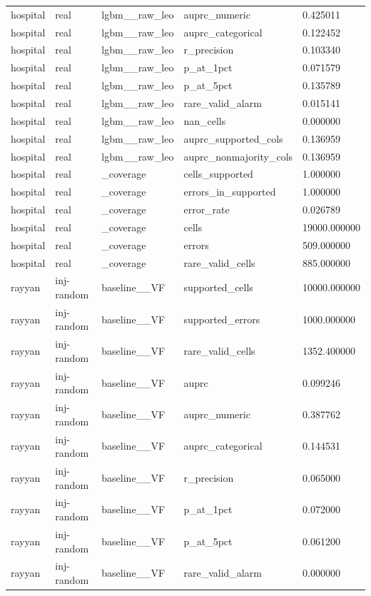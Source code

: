 \begin{tabular}{lllll}
hospital & real & lgbm\_\_raw\_leo & auprc\_numeric & 0.425011 \\
hospital & real & lgbm\_\_raw\_leo & auprc\_categorical & 0.122452 \\
hospital & real & lgbm\_\_raw\_leo & r\_precision & 0.103340 \\
hospital & real & lgbm\_\_raw\_leo & p\_at\_1pct & 0.071579 \\
hospital & real & lgbm\_\_raw\_leo & p\_at\_5pct & 0.135789 \\
hospital & real & lgbm\_\_raw\_leo & rare\_valid\_alarm & 0.015141 \\
hospital & real & lgbm\_\_raw\_leo & nan\_cells & 0.000000 \\
hospital & real & lgbm\_\_raw\_leo & auprc\_supported\_cols & 0.136959 \\
hospital & real & lgbm\_\_raw\_leo & auprc\_nonmajority\_cols & 0.136959 \\
hospital & real & \_coverage & cells\_supported & 1.000000 \\
hospital & real & \_coverage & errors\_in\_supported & 1.000000 \\
hospital & real & \_coverage & error\_rate & 0.026789 \\
hospital & real & \_coverage & cells & 19000.000000 \\
hospital & real & \_coverage & errors & 509.000000 \\
hospital & real & \_coverage & rare\_valid\_cells & 885.000000 \\
rayyan & inj-random & baseline\_\_VF & supported\_cells & 10000.000000 \\
rayyan & inj-random & baseline\_\_VF & supported\_errors & 1000.000000 \\
rayyan & inj-random & baseline\_\_VF & rare\_valid\_cells & 1352.400000 \\
rayyan & inj-random & baseline\_\_VF & auprc & 0.099246 \\
rayyan & inj-random & baseline\_\_VF & auprc\_numeric & 0.387762 \\
rayyan & inj-random & baseline\_\_VF & auprc\_categorical & 0.144531 \\
rayyan & inj-random & baseline\_\_VF & r\_precision & 0.065000 \\
rayyan & inj-random & baseline\_\_VF & p\_at\_1pct & 0.072000 \\
rayyan & inj-random & baseline\_\_VF & p\_at\_5pct & 0.061200 \\
rayyan & inj-random & baseline\_\_VF & rare\_valid\_alarm & 0.000000 \\

\end{tabular}
